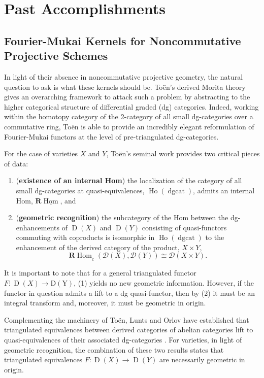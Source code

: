 \documentclass[12pt]{amsart}
\theoremstyle{definition}
\begin{document}
\section*{Past Accomplishments}
\subsection*{Fourier-Mukai Kernels for Noncommutative Projective Schemes}

In light of their absence in noncommutative projective geometry, the natural question to ask is what these kernels should be.
To\"en's derived Morita theory \cite{Toen} gives an overarching framework to attack such a problem by abstracting to the higher categorical structure of differential graded (dg) categories.
Indeed, working within the homotopy category of the 2-category of all small dg-categories over a commutative ring, To\"en is able to provide an incredibly elegant reformulation of Fourier-Mukai functors at the level of pre-triangulated dg-categories.

For the case of varieties \(X\) and \(Y\), To\"en's seminal work \cite{Toen} provides two critical pieces of data:
\begin{enumerate}
\item
  (\textbf{existence of an internal Hom})
  the localization of the category of all small dg-categories at quasi-equivalences, \(\operatorname{Ho}(\operatorname{dgcat})\), admits an internal Hom, \(\mathbf{R}\underline{\operatorname{Hom}}\), and
\item
  (\textbf{geometric recognition})
  the subcategory of the Hom between the dg-enhancements of \(\operatorname{D}(X)\) and \(\operatorname{D}(Y)\) consisting of quasi-functors commuting with coproducts is isomorphic in \(\operatorname{Ho}(\operatorname{dgcat})\) to the enhancement of the derived category of the product, \(X \times Y\),
  \[\mathbf{R}\underline{\operatorname{Hom}}_c\left(\mathcal{D}(X), \mathcal{D}(Y)\right) \cong \mathcal{D}\left(X \times Y\right).\]
\end{enumerate}
It is important to note that for a general triangulated functor \(F \colon \operatorname{D}(X) \to \operatorname{D(Y)}\), (1) yields no new geometric information.
However, if the functor in question admits a lift to a dg quasi-functor, then by (2) it must be an integral transform and, moreover, it must be geometric in origin.

Complementing the machinery of To\"en, Lunts and Orlov have established that triangulated equivalences between derived categories of abelian categories lift to quasi-equivalences of their associated dg-categories \cite{Lunts-Orlov}.
For varieties, in light of geometric recognition, the combination of these two results states that triangulated equivalences \(F \colon \operatorname{D}(X) \to \operatorname{D}(Y)\) are necessarily geometric in origin.
\end{document}
